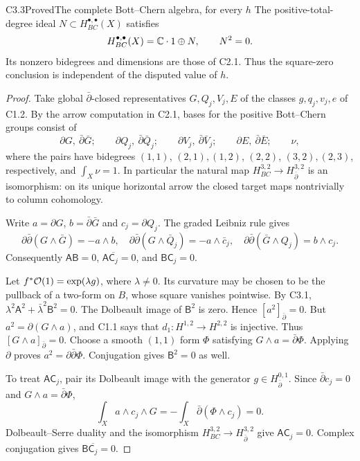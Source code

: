 \begin{claim}{C3.3}{Proved}{The complete Bott--Chern algebra, for every $h$}
The positive-total-degree ideal $N\subset H^{\bullet,\bullet}_{BC}(X)$
satisfies
\[
H^{\bullet,\bullet}_{BC}(X)=\mathbb C\cdot1\oplus N,\qquad N^2=0.
\]
Its nonzero bidegrees and dimensions are those of C2.1.  Thus the
square-zero conclusion is independent of the disputed value of $h$.
\end{claim}
\begin{proof}
Take global $\bar\partial$-closed representatives $G,Q_j,V_j,E$
of the classes $g,q_j,v_j,e$ of C1.2.  By the arrow computation in
C2.1, bases for the positive Bott--Chern groups consist of
\[
\partial G,\ \bar\partial\bar G;\qquad
\partial Q_j,\ \bar\partial\bar Q_j;\qquad
\partial V_j,\ \bar\partial\bar V_j;\qquad
\partial E,\ \bar\partial\bar E;\qquad \nu,
\]
where the pairs have bidegrees $(1,1)$, $(2,1),(1,2)$,
$(2,2)$, $(3,2),(2,3)$, respectively, and
$\int_X\nu=1$.  In particular the natural map
$H^{3,2}_{BC}\to H^{3,2}_{\bar\partial}$ is an isomorphism:
on its unique horizontal arrow the closed target maps nontrivially
to column cohomology.

Write $a=\partial G$, $b=\bar\partial\bar G$ and
$c_j=\partial Q_j$.  The graded Leibniz rule gives
\[
\partial\bar\partial(G\wedge\bar G)=-a\wedge b,
\quad
\partial\bar\partial(G\wedge\bar Q_j)
=-a\wedge\bar c_j,
\quad
\partial\bar\partial(\bar G\wedge Q_j)=b\wedge c_j.
\]
Consequently $\mathsf A\mathsf B=0$,
$\mathsf A\overline{\mathsf C_j}=0$, and
$\mathsf B\mathsf C_j=0$.

Let $f^*\mathcal O(1)=\exp(\lambda g)$, where $\lambda\ne0$.
Its curvature may be chosen to be the pullback of a two-form on $B$,
whose square vanishes pointwise.  By C3.1,
$\lambda^2\mathsf A^2+\bar\lambda^2\mathsf B^2=0$.
The Dolbeault image of $\mathsf B^2$ is zero.  Hence
$[a^2]_{\bar\partial}=0$.  But
$a^2=\partial(G\wedge a)$, and C1.1 says that
$d_1:H^{1,2}\to H^{2,2}$ is injective.  Thus
$[G\wedge a]_{\bar\partial}=0$.  Choose a smooth $(1,1)$ form
$\Phi$ satisfying $G\wedge a=\bar\partial\Phi$.  Applying
$\partial$ proves $a^2=\partial\bar\partial\Phi$.
Conjugation gives $\mathsf B^2=0$ as well.

To treat $\mathsf A\mathsf C_j$, pair its Dolbeault image with the
generator $g\in H^{0,1}_{\bar\partial}$.  Since
$\bar\partial c_j=0$ and $G\wedge a=\bar\partial\Phi$,
\[
\int_X a\wedge c_j\wedge G
=-\int_X\bar\partial(\Phi\wedge c_j)=0.
\]
Dolbeault--Serre duality and the isomorphism
$H^{3,2}_{BC}\to H^{3,2}_{\bar\partial}$ give
$\mathsf A\mathsf C_j=0$.  Complex conjugation gives
$\mathsf B\overline{\mathsf C_j}=0$.


\end{proof}
